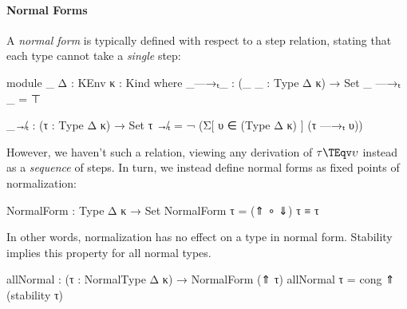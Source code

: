 \paragraph{Normal Forms}
A \emph{normal form} is typically defined with respect to a step relation, stating that each type cannot take a \emph{single} step:

\begin{code}[hide]
  module _ {Δ : KEnv} {κ : Kind} where 
    _—→ₜ_ : (_ _ : Type Δ κ) → Set
    _ —→ₜ _  = ⊤ 
\end{code}
\begin{code}
    _↛ₜ : (τ : Type Δ κ) → Set 
    τ ↛ₜ = ¬ (Σ[ υ ∈ (Type Δ κ) ] (τ —→ₜ υ))
\end{code}

\Ni However, we haven't such a relation, viewing any derivation of $\tau \TEqv \upsilon$ instead as a \emph{sequence} of steps. In turn, we instead define normal forms as fixed points of normalization:

\begin{code}
  NormalForm  : Type Δ κ → Set
  NormalForm τ = (⇑ ∘ ⇓) τ ≡ τ
\end{code}

\Ni In other words, normalization has no effect on a type in normal form. Stability implies this property for all normal types.

\begin{code}
  allNormal : (τ : NormalType Δ κ) → NormalForm (⇑ τ)
  allNormal τ = cong ⇑ (stability τ)
\end{code}